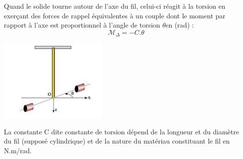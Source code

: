 \documentclass[12pt]{article}
\begin{document}
Quand le solide tourne autour de l'axe du fil, celui-ci réagit à la torsion en exerçant des forces de rappel équivalentes à un couple dont le moment par rapport à l'axe est proportionnel à l'angle de torsion $\theta$en (rad) :
$$
\mathscr{M}_\Delta =-C.\theta
$$
\begin{center}
\includegraphics[width=0.4\textwidth]{./img/img_04.png}\\
\end{center}
La constante C dite constante de torsion dépend de la longueur et du diamètre du fil (supposé cylindrique) et
de la nature du matériau constituant le fil en N.m/rad.
\end{document}
